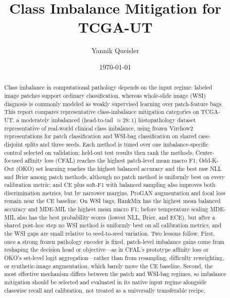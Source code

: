 \documentclass[11pt]{article}
\title{Class Imbalance Mitigation for TCGA-UT}
\author{Yannik Queisler}
\date{\today}
\begin{document}
\maketitle

\begin{abstract}
\noindent Class imbalance in computational pathology depends on the input regime: labeled image patches support ordinary classification, whereas whole-slide image (WSI) diagnosis is commonly modeled as weakly supervised learning over patch-feature bags. This report compares representative class-imbalance mitigation categories on TCGA-UT, a moderately imbalanced (head-to-tail ${\approx}28{:}1$) histopathology dataset representative of real-world clinical class imbalance, using frozen Virchow2 representations for patch classification and WSI-bag classification on shared case-disjoint splits and three seeds. Each method is tuned over one imbalance-specific control selected on validation; held-out test results then rank the methods. Center-focused affinity loss (CFAL) reaches the highest patch-level mean macro F1; Odd-K-Out (OKO) set learning reaches the highest balanced accuracy and the best raw NLL and Brier among patch methods, although no patch method is uniformly best on every calibration metric; and CE plus soft-F1 with balanced sampling also improves both discrimination metrics, but by narrower margins. ProGAN augmentation and focal loss remain near the CE baseline. On WSI bags, RankMix has the highest mean balanced accuracy and MDE-MIL the highest mean macro F1; before temperature scaling MDE-MIL also has the best probability scores (lowest NLL, Brier, and ECE), but after a shared post-hoc step no WSI method is uniformly best on all calibration metrics, and the WSI gaps are small relative to seed-to-seed variation. Two lessons follow. First, once a strong frozen pathology encoder is fixed, patch-level imbalance gains come from reshaping the decision head or objective---as in CFAL's prototype affinity loss or OKO's set-level logit aggregation---rather than from resampling, difficulty reweighting, or synthetic-image augmentation, which barely move the CE baseline. Second, the most effective mechanism differs between the patch and WSI-bag regimes, so imbalance mitigation should be selected and evaluated in its native input regime alongside classwise recall and calibration, not treated as a universally transferable recipe.
\end{abstract}
\clearpage

\setcounter{tocdepth}{2}
\tableofcontents
\clearpage
\end{document}
